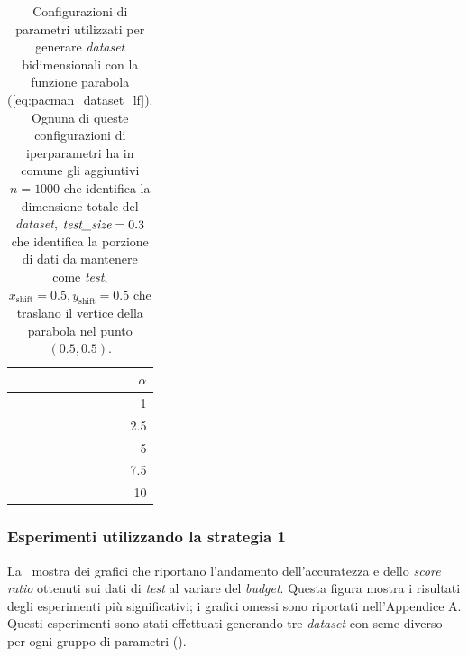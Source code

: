 \begin{table}
    \centering
    \begin{tabular}{r}
        \toprule
        $\alpha$\\
        \midrule
        1   \\
        2.5 \\
        5   \\
        7.5 \\
        10  \\
        \bottomrule
    \end{tabular}
    \caption{Configurazioni di parametri utilizzati per generare \emph{dataset} bidimensionali con la funzione parabola (\ref{eq:pacman_dataset_lf}). Ognuna di queste configurazioni di iperparametri ha in comune gli aggiuntivi $n=1000$ che identifica la dimensione totale del \emph{dataset}, $\emph{test\_size}=0.3$ che identifica la porzione di dati da mantenere come \emph{test}, $x_\text{shift}=0.5, y_\text{shift}=0.5$ che traslano il vertice della parabola nel punto $(0.5,0.5)$.}
    \label{tab:parametri_ds_pacman}
\end{table}

\subsubsection{Esperimenti utilizzando la strategia 1}
La~ mostra dei grafici che riportano l'andamento dell'accuratezza e dello \emph{score ratio} ottenuti sui dati di \emph{test} al variare del \emph{budget}.
Questa figura mostra i risultati degli esperimenti più significativi; i grafici omessi sono riportati nell'Appendice A.
Questi esperimenti sono stati effettuati generando tre \emph{dataset} con seme diverso per ogni gruppo di parametri ().

